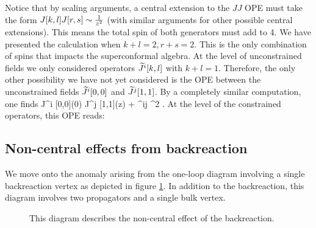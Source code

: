 \documentclass[../main.tex]{subfiles}
\begin{document}

Notice that by scaling arguments, a central extension to the $JJ$ OPE must take the form $J[k, l]J[r, s] \sim {1 \over z^2}$ (with similar arguments for other possible central extensions). This means the total spin of both generators must add to 4. 
We have presented the calculation when $k + l =2, r + s =2$. 
This is the only combination of spins that impacts the superconformal algebra. 
At the level of unconstrained fields we only considered operators $\widetilde J^i [k,l]$ with $k+l = 1$.
Therefore, the only other possibility we have not yet considered is the OPE between the unconstrained fields $\widetilde J^i [0,0]$ and $\widetilde J^j [1,1]$.
By a completely similar computation, one finds
\beqn
\til J^i [0,0](0) \til J^j [1,1](z) \simeq \cdots + \eps^{ij}  ^2 .
\eeqn
At the level of the constrained operators, this OPE reads:


\subsection{Non-central effects from backreaction}

We move onto the anomaly arising from the one-loop diagram involving a single backreaction vertex as depicted in figure \ref{fig:oneloopsinglebr}.
In addition to the backreaction, this diagram involves two propagators and a single bulk vertex.

\begin{figure}
	\label{fig:oneloopsinglebr}
	\caption{This diagram describes the non-central effect of the backreaction.}
\end{figure}
\end{document}
